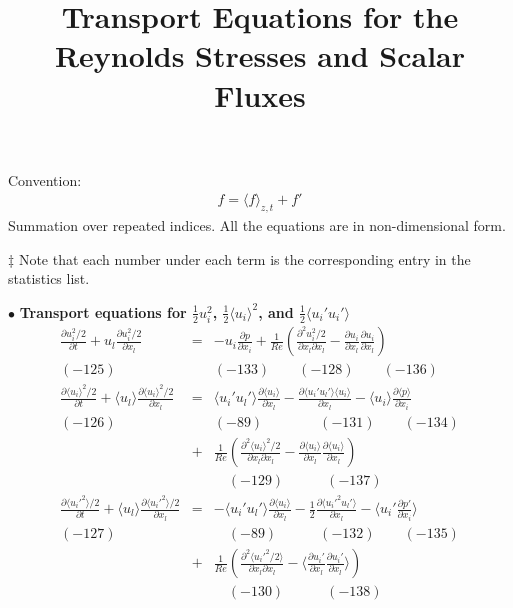 \documentclass[a4paper,11pt]{article}
\begin{document}
\title{Transport Equations for the Reynolds Stresses and Scalar Fluxes}
\maketitle

\noindent Convention:
\begin{eqnarray*}
f = \langle f \rangle_{z,t} + f' \nonumber
\end{eqnarray*}
Summation over repeated indices. All the equations are in non-dimensional form.


\noindent $\ddag$ Note that each number under each term is the corresponding entry in the statistics list.

\noindent $\bullet$ \textbf{Transport equations for $\frac{1}{2}u_i^2$, $\frac{1}{2}\langle u_i\rangle^2$, and $\frac{1}{2}\langle u_i'u_i'\rangle$}
\begin{eqnarray}
\frac{\partial u_i^2 /2}{\partial t}
+u_l\frac{\partial u_i^2/2 }{\partial x_l}
&=&-u_i\frac{\partial p }{\partial x_i}
+\frac{1}{Re}(\frac{\partial^2 u_i^2 /2}{\partial x_l\partial x_l}-\frac{\partial u_i }{\partial x_l}\frac{\partial u_i }{\partial x_l}) \\
(-125)\quad{} &&(-133) \quad{}  \quad{} (-128) \quad{} \quad{} (-136)\nonumber \\
\frac{\partial \langle u_i\rangle^2 /2 }{\partial t}
+\langle u_l\rangle \frac{\partial \langle u_i\rangle^2 /2 }{\partial x_l}
&=&\langle u_i'u_l'\rangle \frac{\partial \langle u_i \rangle}{\partial x_l}
-\frac{\partial \langle u_i'u_l'\rangle \langle u_i \rangle }{\partial x_l}%
-\langle u_i\rangle \frac{\partial \langle p\rangle }{\partial x_i}\nonumber \\
(-126)\quad{} && (-89) \qquad{} \qquad{} (-131)  \quad{} \quad{} (-134)\nonumber \\
&+&\frac{1}{Re}(\frac{\partial^2 \langle u_i\rangle^2 /2 }{\partial x_l\partial x_l}-\frac{\partial \langle u_i\rangle }{\partial x_l} \frac{\partial \langle u_i\rangle }{\partial x_l}) \\
&&\quad{}(-129) \quad{} \qquad{} (-137) \nonumber \\
\frac{\partial \langle u_i'^2\rangle/2 }{\partial t}
+\langle u_l\rangle \frac{\partial \langle u_i'^2\rangle/2 }{\partial x_l}
&=&-\langle u_i'u_l'\rangle \frac{\partial \langle u_i \rangle  }{\partial x_l}
-\frac{1}{2}\frac{\partial \langle u_i'^2u_l'\rangle}{\partial x_l} 
-\langle u_i' \frac{\partial  p' }{\partial x_i}\rangle \nonumber \\
(-127)\quad{} &&\quad{} (-89) \qquad{} \quad{} (-132) \quad{} \quad{} (-135) \nonumber \\
&+&\frac{1}{Re}(\frac{\partial^2 \langle u_i'^2 /2\rangle}{\partial x_l\partial x_l}-\langle \frac{\partial  u_i' }{\partial x_l}\frac{\partial  u_i' }{\partial x_l}\rangle) \\
&&\quad{} (-130) \qquad{} \quad{}(-138) \nonumber 
\end{eqnarray}
\end{document}
